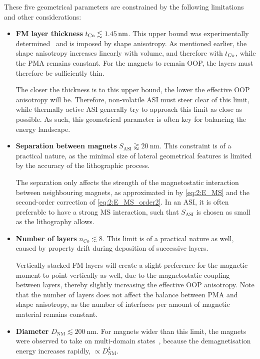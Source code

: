 These five geometrical parameters are constrained by the following limitations and other considerations:
\begin{itemize}
	\item \textbf{FM layer thickness} $t_{\ce{Co}} \lesssim \SI{1.45}{\nano\metre}$.\newline
	This upper bound was experimentally determined~\cite{KUR-24} and is imposed by shape anisotropy.
	As mentioned earlier, the shape anisotropy increases linearly with volume, and therefore with $t_{\ce{Co}}$, while the PMA remains constant. %
	For the magnets to remain OOP, the layers must therefore be sufficiently thin. \par
	The closer the thickness is to this upper bound, the lower the effective OOP anisotropy will be.
	Therefore, non-volatile ASI must steer clear of this limit, while thermally active ASI generally try to approach this limit as close as possible.
	As such, this geometrical parameter is often key for balancing the energy landscape.
	\item \textbf{Separation between magnets} $S_\mathrm{ASI} \gtrapprox \SI{20}{\nano\metre}$.
	This constraint is of a practical nature, as the minimal size of lateral geometrical features is limited by the accuracy of the lithographic process. \par
	The separation only affects the strength of the magnetostatic interaction between neighbouring magnets, as approximated in \hotspice by \cref{eq:2:E_MS} and the second-order correction of \cref{eq:2:E_MS_order2}.
	In an ASI, it is often preferable to have a strong MS interaction, such that $S_\mathrm{ASI}$ is chosen as small as the lithography allows.
	\item \textbf{Number of layers} $n_{Co} \lesssim 8$.
	This limit is of a practical nature as well, caused by property drift during deposition of successive layers. \par
	Vertically stacked FM layers will create a slight preference for the magnetic moment to point vertically as well, due to the magnetostatic coupling between layers, thereby slightly increasing the effective OOP anisotropy.
	Note that the number of layers does not affect the balance between PMA and shape anisotropy, as the number of interfaces per amount of magnetic material remains constant.
	\item \textbf{Diameter} $D_\mathrm{NM} \lesssim \SI{200}{\nano\metre}$.
	For magnets wider than this limit, the magnets were observed to take on multi-domain states~\cite{KUR-24}, because the demagnetisation energy increases rapidly, $\propto D_\mathrm{NM}^4$.

\end{itemize}
